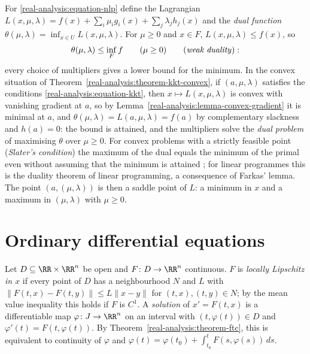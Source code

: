 \begin{remark}[Duality]\label{real-analysis:remark-lagrange-duality}
For \eqref{real-analysis:equation-nlp} define the Lagrangian $L(x, \mu, \lambda) = f(x) + \sum_i\mu_ig_i(x) + \sum_j\lambda_jh_j(x)$ and the \emph{dual function} $\theta(\mu, \lambda) = \inf_{x \in U}L(x, \mu, \lambda)$.
For $\mu \geq 0$ and $x \in F$, $L(x, \mu, \lambda) \leq f(x)$, so
\[
\theta(\mu, \lambda) \leq \inf_Ff \qquad (\mu \geq 0) \qquad \text{(\emph{weak duality})}:
\]
every choice of multipliers gives a lower bound for the minimum. In the convex situation of Theorem~\ref{real-analysis:theorem-kkt-convex}, if $(a, \mu, \lambda)$ satisfies the conditions
\eqref{real-analysis:equation-kkt}, then $x \mapsto L(x, \mu, \lambda)$ is convex with vanishing gradient at $a$, so by Lemma~\ref{real-analysis:lemma-convex-gradient} it is minimal at $a$, and
$\theta(\mu, \lambda) = L(a, \mu, \lambda) = f(a)$ by complementary slackness and $h(a) = 0$: the bound is attained, and the multipliers solve the \emph{dual problem} of maximising $\theta$ over $\mu \geq 0$. For convex problems
with a strictly feasible point (\emph{Slater's condition}) the maximum of the dual equals the minimum of the primal even without assuming that the minimum is attained \cite[Chapter 5]{boyd-vandenberghe};
for linear programmes this is the duality theorem of linear programming, a consequence of Farkas' lemma. The point $(a, (\mu, \lambda))$ is then a saddle point of $L$: a minimum in $x$ and a
maximum in $(\mu, \lambda)$ with $\mu \geq 0$.
\end{remark}

\section{Ordinary differential equations}\label{real-analysis:section-ode}

\begin{definition}\label{real-analysis:definition-ode}
Let $D \subseteq \RR \times \RR^n$ be open and $F \colon D \to \RR^n$ continuous. $F$ is \emph{locally Lipschitz in $x$} if every point of $D$ has a neighbourhood $N$ and $L$ with
$\|F(t, x) - F(t, y)\| \leq L\|x - y\|$ for $(t, x), (t, y) \in N$; by the mean value inequality this holds if $F$ is $C^1$. A \emph{solution} of $x' = F(t, x)$ is a differentiable map $\varphi \colon J \to \RR^n$
on an interval with $(t, \varphi(t)) \in D$ and $\varphi'(t) = F(t, \varphi(t))$. By Theorem~\ref{real-analysis:theorem-ftc}, this is equivalent to continuity of $\varphi$ and
$\varphi(t) = \varphi(t_0) + \int_{t_0}^tF(s, \varphi(s))\,ds$.
\end{definition}

